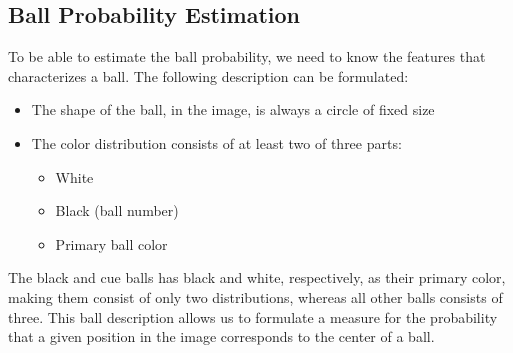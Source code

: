 \subsection{Ball Probability Estimation}
To be able to estimate the ball probability, we need to know the features that characterizes a ball. The following description can be formulated:
\begin{itemize}
\item The shape of the ball, in the image, is always a circle of fixed size
\item The color distribution consists of at least two of three parts:
	\begin{itemize}
		\item White
		\item Black (ball number)
		\item Primary ball color
	\end{itemize}
\end{itemize}
The black and cue balls has black and white, respectively, as their primary color, making them consist of only two distributions, whereas all other balls consists of three. This ball description allows us to formulate a measure for the probability that a given position in the image corresponds to the center of a ball.

